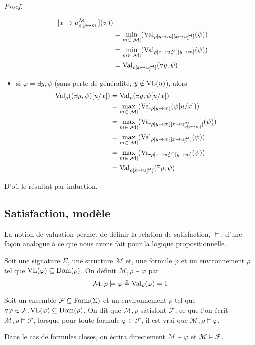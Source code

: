 \begin{proof}
\begin{itemize}
\begin{align*}
{        [x\mapsto u^\mathcal M_{\rho[y\mapsto m]}]}(\psi))\\
      &= \min_{m\in|\mathcal M|}(\operatorname{Val}_{\rho[y\mapsto m][x\mapsto u^\mathcal M_\rho]}(\psi))\\
      &= \min_{m\in|\mathcal M|}(\operatorname{Val}_{\rho[x\mapsto u^\mathcal M_\rho][y\mapsto m]}(\psi))\\
      &= \operatorname{Val}_{\rho[x\mapsto u^\mathcal M_\rho]}(\forall y, \psi)
    \end{align*}
  \item si $\varphi = \exists y, \psi$ (sans perte de généralité,
    $y\notin \operatorname{VL}(u)$), alors
    \begin{align*}
      \operatorname{Val}_\rho((\exists y,\psi)[u/x]) &= \operatorname{Val}_\rho(\exists y,\psi[u/x])\\
      &= \max_{m\in|\mathcal M|}(\operatorname{Val}_{\rho[y \mapsto m]}(\psi[u/x]))\\
      &= \max_{m\in|\mathcal M|}(\operatorname{Val}_{\rho[y\mapsto m]
        [x\mapsto u^\mathcal M_{\rho[y\mapsto m]}]}(\psi))\\
      &= \max_{m\in|\mathcal M|}(\operatorname{Val}_{\rho[y\mapsto m][x\mapsto u^\mathcal M_\rho]}(\psi))\\
      &= \max_{m\in|\mathcal M|}(\operatorname{Val}_{\rho[x\mapsto u^\mathcal M_\rho][y\mapsto m]}(\psi))\\
      &= \operatorname{Val}_{\rho[x\mapsto u^\mathcal M_\rho]}(\exists y, \psi)
    \end{align*}
  \end{itemize}
  D'où le résultat par induction.
\end{proof}

\subsection{Satisfaction, modèle}

La notion de valuation permet de définir la relation de satisfaction, $\models$,
d'une façon analogue à ce que nous avons fait pour la logique propositionnelle.

\begin{definition}[Satisfaction]
  Soit une signature $\Sigma$, une structure $\mathcal M$ et, une formule
  $\varphi$ et un environnement $\rho$ tel que
  $\operatorname{VL}(\varphi)\subseteq\operatorname{Dom}(\rho)$.
  On définit $\mathcal M,\rho\models \varphi$ par
  \[\mathcal M,\rho\models \varphi \triangleq \operatorname{Val}_\rho(\varphi) = 1\]

  Soit un ensemble $\mathcal F\subseteq\operatorname{Form}(\Sigma)$ et un environnement
  $\rho$ tel que
  $\forall \varphi\in\mathcal F, \operatorname{VL}(\varphi)\subseteq\operatorname{Dom}(\rho)$.
  On dit que $\mathcal M,\rho$ satisfont $\mathcal F$, ce que l'on écrit
  $\mathcal M,\rho\models\mathcal F$, lorsque pour toute formule
  $\varphi\in\mathcal F$, il est vrai que $\mathcal M,\rho\models \varphi$.

  Dans le cas de formules closes, on écrira directement
  $\mathcal M\models\varphi$ et $\mathcal M\models \mathcal F$.
\end{definition}


